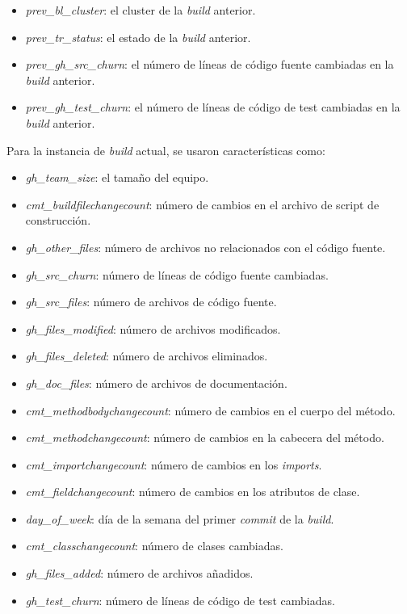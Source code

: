 \begin{itemize}
      \item \textit{prev\_bl\_cluster}: el cluster de la \textit{build} anterior.
      \item \textit{prev\_tr\_status}: el estado de la \textit{build} anterior.
      \item \textit{prev\_gh\_src\_churn}: el número de líneas de código fuente cambiadas en la
            \textit{build} anterior.
      \item \textit{prev\_gh\_test\_churn}: el número de líneas de código de test cambiadas en la
            \textit{build} anterior.
\end{itemize}

Para la instancia de \textit{build} actual, se usaron características como:

\begin{itemize}
      \item \textit{gh\_team\_size}: el tamaño del equipo.
      \item \textit{cmt\_buildfilechangecount}: número de cambios en el archivo de script de
      construcción.
      \item \textit{gh\_other\_files}: número de archivos no relacionados con el código fuente.
      \item \textit{gh\_src\_churn}: número de líneas de código fuente cambiadas.
      \item \textit{gh\_src\_files}: número de archivos de código fuente.
      \item \textit{gh\_files\_modified}: número de archivos modificados.
      \item \textit{gh\_files\_deleted}: número de archivos eliminados.
      \item \textit{gh\_doc\_files}: número de archivos de documentación.
      \item \textit{cmt\_methodbodychangecount}: número de cambios en el cuerpo del método.
      \item \textit{cmt\_methodchangecount}: número de cambios en la cabecera del método.
      \item \textit{cmt\_importchangecount}: número de cambios en los \textit{imports}.
      \item \textit{cmt\_fieldchangecount}: número de cambios en los atributos de clase.
      \item \textit{day\_of\_week}: día de la semana del primer \textit{commit} de la
      \textit{build}.
      \item \textit{cmt\_classchangecount}: número de clases cambiadas.
      \item \textit{gh\_files\_added}: número de archivos añadidos.
      \item \textit{gh\_test\_churn}: número de líneas de código de test cambiadas.
\end{itemize}

